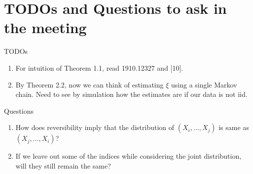 \chapter{TODOs and Questions to ask in the meeting}

TODOs
\begin{enumerate}
    \item For intuition of Theorem 1.1, read 1910.12327 and [10].
    \item By Theorem 2.2, now we can think of estimating $\xi$ using a single Markov chain. Need to see by simulation how the estimates are if our data is not iid.
\end{enumerate}

Questions
\begin{enumerate}
    \item How does reversibility imply that the distribution of $(X_i, \dots, X_j)$ is same as $(X_j, \dots, X_i)$?
    \item If we leave out some of the indices while considering the joint distribution, will they still remain the same?
\end{enumerate}